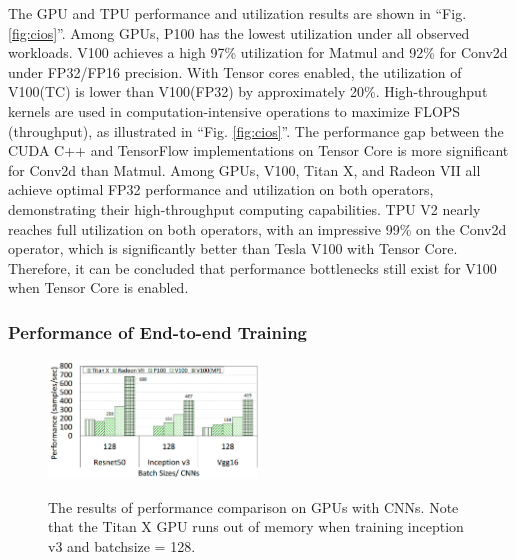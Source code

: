 The GPU and TPU performance and utilization results are shown in ``Fig. \ref{fig:cios}''.
Among GPUs, P100 has the lowest utilization under all observed workloads.
V100 achieves a high 97\% utilization for Matmul and 92\% for Conv2d under FP32/FP16 precision.
With Tensor cores enabled, the utilization of V100(TC) is lower than V100(FP32) by approximately 20\%.
High-throughput kernels are used in computation-intensive operations to maximize FLOPS (throughput), as illustrated in ``Fig. \ref{fig:cios}''.
The performance gap between the CUDA C++ and TensorFlow implementations on Tensor Core is more significant for Conv2d than Matmul.
Among GPUs, V100, Titan X, and Radeon VII all achieve optimal FP32 performance and utilization on both operators, demonstrating their high-throughput computing capabilities.
TPU V2 nearly reaches full utilization on both operators, with an impressive 99\% on the Conv2d operator, which is significantly better than Tesla V100 with Tensor Core.
Therefore, it can be concluded that performance bottlenecks still exist for V100 when Tensor Core is enabled.

\subsubsection{Performance of End-to-end Training}

\begin{figure}[htbp!]
    \centering
    {    \includegraphics[width=0.5\textwidth]{images/gpucnn}}
    \caption{The results of performance comparison on GPUs with CNNs. Note that the Titan X GPU runs out of memory when training inception v3 and batchsize = 128.}
    \label{fig:cnn}
\end{figure}

